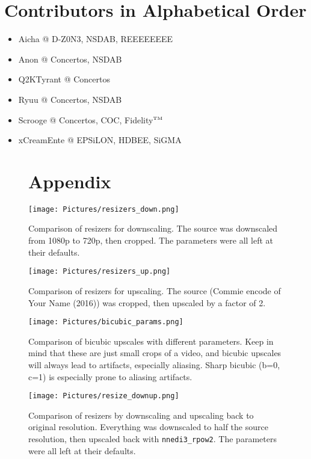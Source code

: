 \documentclass{scrartcl}
\begin{document}
\pagebreak

\section{Contributors in Alphabetical Order}

\begin{itemize}
\item Aicha @ D-Z0N3, NSDAB, REEEEEEEE
\item Anon @ Concertos, NSDAB
\item Q2KTyrant @ Concertos
\item Ryuu @ Concertos, NSDAB
\item Scrooge @ Concertos, COC, Fidelity$^\textrm{\tiny{TM}}$
\item xCreamEnte @ EPSiLON, HDBEE, SiGMA
\end{itemize}

\begin{figure}[h]
\section{Appendix}
\centering
\texttt{[image: Pictures/resizers\_down.png]}
\caption{Comparison of resizers for downscaling.  The source was downscaled from 1080p to 720p, then cropped.  The parameters were all left at their defaults.}\label{fig:14}
\end{figure}

\begin{figure}[h]
\centering
\texttt{[image: Pictures/resizers\_up.png]}
\caption{Comparison of resizers for upscaling.  The source (Commie encode of Your Name (2016)) was cropped, then upscaled by a factor of 2.}\label{fig:15}
\end{figure}

\begin{figure}[h]
\centering
\texttt{[image: Pictures/bicubic\_params.png]}
\caption{Comparison of bicubic upscales with different parameters.  Keep in mind that these are just small crops of a video, and bicubic upscales will always lead to artifacts, especially aliasing.  Sharp bicubic (b=0, c=1) is especially prone to aliasing artifacts.}\label{fig:22}
\end{figure}

\begin{figure}[h]
\centering
\texttt{[image: Pictures/resize\_downup.png]}
\caption{Comparison of resizers by downscaling and upscaling back to original resolution.  Everything was downscaled to half the source resolution, then upscaled back with \texttt{nnedi3\_rpow2}.  The parameters were all left at their defaults.}\label{fig:20}
\end{figure}
\end{document}

